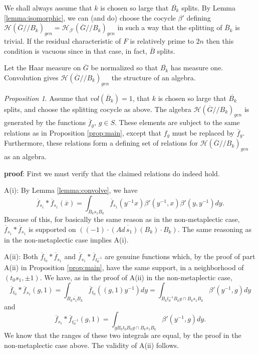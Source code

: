 \documentclass[12pt,letterpaper]{amsart}
\theoremstyle{definition}
\theoremstyle{remark}
\newtheorem{proposition}[theorem]{Proposition}
\begin{document}
We shall
always assume that $k$ is chosen so large 
that $\overline{B_k}$ splits.
By Lemma \ref{lemma:isomorphic},
we can (and do) choose the cocycle ${\beta'}$ defining
$\mathcal{H}(\overline{G}//B_k)_{gen}=
\mathcal{H}_{\beta'}(\overline{G}//B_k)_{gen}$
in such a way that the splitting of 
$\overline{B}_k$ is trivial.
If the residual characteristic of $F$ is relatively
prime to $2n$ then this condition is
vacuous since in that case, in fact,
$\overline{B}$ splits.

Let the Haar measure on $\overline{G}$ be normalized so that
$\overline{B_k}$ has measure one.
Convolution gives $\mathcal{H}(\overline{G}//B_k)_{gen}$ the structure of an
algebra. 

\begin{proposition} 
\label{prop:main2}
Assume that $vol(\overline{B}_k)=1$,
that $k$ is chosen so large that $\overline{B_k}$ splits,
and choose the splitting cocycle as above.
The algebra $\mathcal{H}(\overline{G}//B_k)_{gen}$
is generated by the functions $\overline{f}_g$, $g\in S$.
These elements are subject to the same relations 
as in Proposition \ref{prop:main}, except that $f_g$ must be
replaced by $\overline{f}_g$.
Furthermore, these relations form a defining set of relations for
$\mathcal{H}(\overline{G}//B_k)_{gen}$ as an algebra.
\end{proposition}

{\bf proof}: First we must verify that the claimed relations do 
indeed hold.

A(i): By Lemma \ref{lemma:convolve}, we have
\[
\overline{f}_{s_1}*\overline{f}_{s_1}(\overline{x})
=\int_{B_ks_1B_k}
\overline{f}_{s_1}(y^{-1}x)\beta'(y^{-1},x)\beta'(y,y^{-1})dy.
\]
Because of this, for basically 
the same reason as in the non-metaplectic case, 
$\overline{f}_{s_1}*\overline{f}_{s_1}$
is supported on $\overline{((-1)\cdot (Ad\, s_1)(B_k)\cdot B_k)}$.
The same reasoning as in the non-metaplectic case
implies A(i).

A(ii): Both $\overline{f}_{t_0}*\overline{f}_{s_1}$ and 
$\overline{f}_{s_1}*\overline{f}_{t_0^{-1}}$ are genuine functions which,
by the proof of part A(ii) in Proposition \ref{prop:main},
have the same support, in a neighborhood
of $(t_0s_1,\pm 1)$. We have, as in the proof of
A(ii) in the non-metaplectic case,
\[
\overline{f}_{t_0}*\overline{f}_{s_1}(g,1)
=\int_{\overline{B_ks_1B_k}}
\overline{f}_{t_0}((g,1)y^{-1})dy
=\int_{B_kt_0^{-1}B_kg\cap B_ks_1B_k} 
\beta'(y^{-1},g)dy
\]
and
\[
\overline{f}_{s_1}*\overline{f}_{t_0^{-1}}(g,1)
=\int_{gB_kt_0B_kg\cap B_ks_1B_k} \beta'(y^{-1},g)dy.
\]
We know that the ranges of these two integrals are 
equal,
by the proof in the non-metaplectic case above.
The validity of A(ii) follows.
\end{document}
